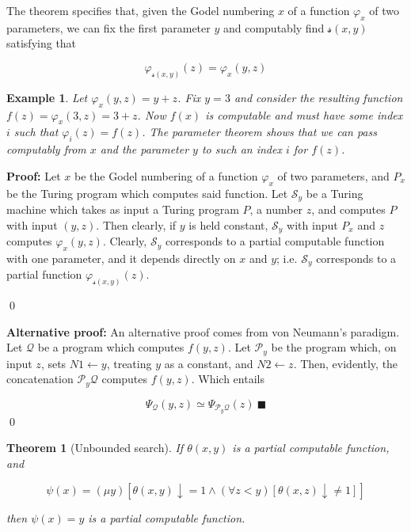 \documentclass[a4paper, 12pt]{article}
\newtheorem{example}{Example}
\newtheorem{theorem}{Theorem}
\newtheorem{example}{Example} \newtheorem{definition}{Definition}
\newtheorem{theorem}{Theorem}
\newenvironment{proof}[1][Proof]{\par\small\noindent\textbf{#1:} }{\qed\par\normalsize}
\begin{document}
The theorem specifies that, given the Godel numbering $x$ of a function 
$\varphi_x$ of two parameters, we can fix the first parameter $y$ and computably 
find $\mathcal{s}(x, y)$ satisfying that 

\begin{equation*}
    \varphi_{\mathcal{s}(x, y)}(z) = \varphi_x(y, z)
\end{equation*}

\begin{example}
    Let $\varphi_x(y, z) = y + z$. Fix $y = 3$ and consider the resulting function 
    $f(z) = \varphi_x(3, z) = 3 + z$. Now $f(x)$ is computable and must have 
    some index $i$ such that $\varphi_i(z) = f(z)$. The parameter theorem 
    shows that we can pass computably from $x$ and the parameter 
    $y$ to such an index $i$ for $f(z)$.
\end{example}

\begin{proof}
    Let $x$ be the Godel numbering of a function $\varphi_x$ of two parameters,
    and $P_x$ be the Turing program which computes said function. 
    Let $\mathcal{S}_y$ be a Turing machine which takes as input a 
    Turing program $P$, a number $z$, and computes $P$ with input 
    $(y, z)$. Then clearly, if $y$ is held constant, 
    $\mathcal{S}_y$ with input $P_x$ and $z$ computes $\varphi_x(y, z)$.
    Clearly, $\mathcal{S}_y$ corresponds to a partial computable function
    with one parameter, and it depends directly on $x$ and $y$;
    i.e. $\mathcal{S}_y$ corresponds to a partial function $\varphi_{\mathcal{s}(x, y)}(z)$.


\end{proof}

\begin{proof}[Alternative proof]
    An alternative proof comes from von Neumann's paradigm. Let $\mathcal{Q}$ be a
    program which computes $f(y, z)$. Let $\mathcal{P}_y$ be the program 
    which, on input $z$, sets $N 1 \leftarrow y$, treating 
    $y$ as a constant, and $N 2 \leftarrow z$. Then, evidently, the 
    concatenation $\mathcal{P}_y \mathcal{Q}$ computes $f(y, z)$.
    Which entails 

    \begin{equation*}
        \Psi_{\mathcal{Q}}(y, z) \simeq \Psi_{\mathcal{P}_y\mathcal{Q}}(z) ~ \blacksquare
    \end{equation*}
\end{proof}

\begin{theorem}[Unbounded search]
    If $\theta(x, y)$ is a partial computable function, and  

    \begin{equation*}
        \psi(x) = (\mu y) \left[ \theta(x, y)\downarrow = 1 \land \left( \forall z < y \right) \left[ \theta(x, z) \downarrow \neq 1 \right]  \right] 
    \end{equation*}

    then $\psi(x) = y$ is a partial computable function.
\end{theorem}
\end{document}
